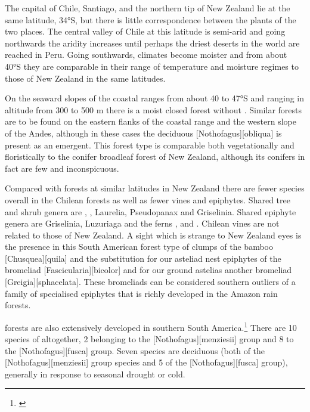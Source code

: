 The capital of Chile, Santiago, and the northern tip of New Zealand lie at the same latitude, 34°S, but there is little correspondence between the plants of the two places.
The central valley of Chile at this latitude is semi-arid and going northwards the aridity increases until perhaps the driest deserts in the world are reached in Peru.
Going southwards, climates become moister and from about 40°S they are comparable in their range of temperature and moisture regimes to those of New Zealand in the same latitudes.

On the seaward slopes of the coastal ranges from about 40 to 47°S and ranging in altitude from 300 to 500 m there is a moist closed forest without .
Similar forests are to be found on the eastern flanks of the coastal range and the western slope of the Andes, although in these cases the deciduous [Nothofagus][obliqua] is present as an emergent.
This forest type is comparable both vegetationally and floristically to the conifer broadleaf forest of New Zealand, although its conifers in fact are few and inconspicuous.

Compared with forests at similar latitudes in New Zealand there are fewer species overall in the Chilean forests as well as fewer vines and epiphytes.
Shared tree and shrub genera are , , Laurelia, Pseudopanax and Griselinia.
Shared epiphyte genera are Griselinia, Luzuriaga and the ferns ,  and .
Chilean vines are not related to those of New Zealand.
A sight which is strange to New Zealand eyes is the presence in this South American forest type of clumps of the bamboo [Chusquea][quila] and the substitution for our asteliad nest epiphytes of the bromeliad [Fascicularia][bicolor] and for our ground astelias another bromeliad [Greigia][sphacelata].
These bromeliads can be considered southern outliers of a family of specialised epiphytes that is richly developed in the Amazon rain forests.

 forests are also extensively developed in southern South America.\footnote{\cite{mcqueen1976ecology}}
There are 10 species of  altogether, 2 belonging to the [Nothofagus][menziesii] group and 8 to the [Nothofagus][fusca] group.
Seven species are deciduous (both of the [Nothofagus][menziesii] group species and 5 of the [Nothofagus][fusca] group), generally in response to seasonal drought or cold.


